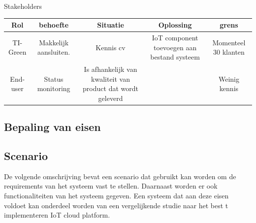\begin{frame}{Stakeholders}
	\begin{table}[htbp]
		\centering
		\begin{tabular}{|c|c|c|c|c|}\hline
			Rol&behoefte&Situatie&Oplossing&grens\\\hline
			
			
			TI-Green&\multicolumn{1}{m{2cm}|}{Makkelijk aansluiten.   }&\multicolumn{1}{m{4cm}|}{ Kennis cv}&
			\multicolumn{1}{m{3cm}|}{	IoT component toevoegen aan bestand systeem
			}&\multicolumn{1}{m{3cm}|}{ Momenteel 30 klanten}\\\hline
			
			
			End-user &\multicolumn{1}{m{2cm}|}{Status monitoring }&\multicolumn{1}{m{4cm}|}{Is afhankelijk van kwaliteit van product dat wordt geleverd }&
			\multicolumn{1}{m{4cm}|}{ }&\multicolumn{1}{m{3cm}|}{Weinig kennis }\\\hline
			
			
			
			
			
			
		\end{tabular}
	\end{table}
	
\end{frame}
\subsection{Bepaling van eisen}

\subsection{Scenario}
De volgende omschrijving bevat een scenario dat gebruikt kan worden om de requirements van het systeem vast te stellen. Daarnaast worden er ook functionaliteiten van het systeem gegeven. Een systeem dat aan deze eisen voldoet kan onderdeel worden van een vergelijkende studie naar het best t implementeren IoT cloud platform.

